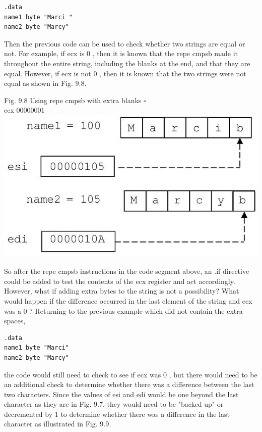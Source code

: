 \documentclass[10pt]{article}
\begin{document}
\begin{verbatim}
.data
name1 byte "Marci "
name2 byte "Marcy"
\end{verbatim}

Then the previous code can be used to check whether two strings are equal or not. For example, if ecx is 0 , then it is known that the repe cmpsb made it throughout the entire string, including the blanks at the end, and that they are equal. However, if ecx is not 0 , then it is known that the two strings were not equal as shown in Fig. 9.8.

Fig. 9.8 Using repe cmpsb with extra blanks $\square$\\
ecx 00000001\\
\includegraphics[max width=\textwidth, center]{2025_03_24_ebe50cc223a6fbc49eecg-211(1)}

So after the repe cmpsb instructions in the code segment above, an .if directive could be added to test the contents of the ecx register and act accordingly. However, what if adding extra bytes to the string is not a possibility? What would happen if the difference occurred in the last element of the string and ecx was a 0 ? Returning to the previous example which did not contain the extra spaces,

\begin{verbatim}
.data
name1 byte "Marci"
name2 byte "Marcy"
\end{verbatim}

the code would still need to check to see if ecx was 0 , but there would need to be an additional check to determine whether there was a difference between the last two characters. Since the values of esi and edi would be one beyond the last character as they are in Fig. 9.7, they would need to be "backed up" or decremented by 1 to determine whether there was a difference in the last character as illustrated in Fig. 9.9.
\end{document}
